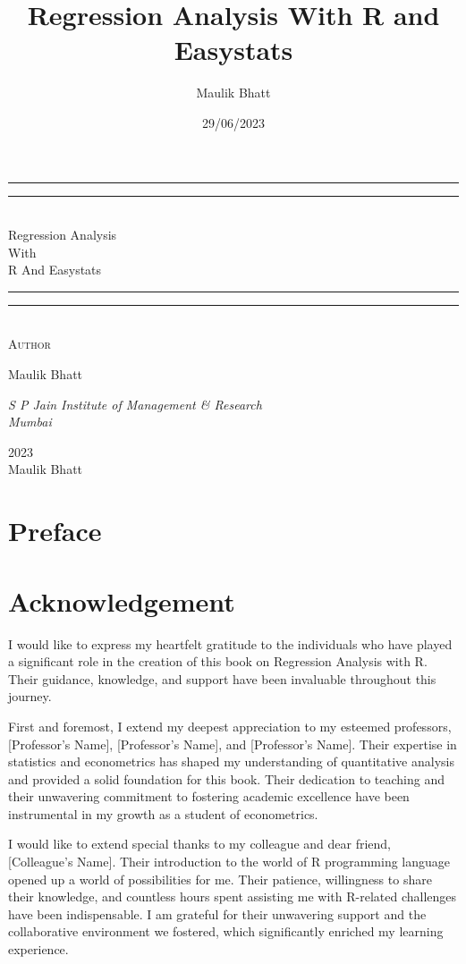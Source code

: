 \documentclass[
  letterpaper,
  paper =a4,
  twoside,
  openright,
  headsepline,
  footsepline,
  listof = totocnumbered,
  chapterprefix = true,
  firstiscover]{scrbook}
\title{Regression Analysis With R and Easystats}
\author{Maulik Bhatt}
\date{29/06/2023}
\renewcommand{\maketitle}{
\begin{titlepage}
	\centering
	\vspace*{\baselineskip}
	\rule{\textwidth}{1.6pt}\vspace*{-\baselineskip}\vspace*{2pt}
	\rule{\textwidth}{0.4pt}\\[\baselineskip]
	{\LARGE Regression Analysis\\ With \\[0.3\baselineskip] R And Easystats}\\[0.2\baselineskip]
	\rule{\textwidth}{0.4pt}\vspace*{-\baselineskip}\vspace{3.2pt}
	\rule{\textwidth}{1.6pt}\\[\baselineskip]
	\scshape
	\vspace*{8\baselineskip}
	Author \\[\baselineskip]
	{\Large Maulik Bhatt \par}
	{\itshape S P Jain Institute of Management \& Research \\ Mumbai\par}
	\vfill
	{\scshape 2023} \\
	{\large Maulik Bhatt}\par%
\end{titlepage}
}
\renewcommand*\contentsname{Table of contents}
\newcommand\contentsname{Table of contents}
\begin{document}
\frontmatter
\maketitle
\ifdefined\Shaded\renewenvironment{Shaded}{\begin{tcolorbox}[borderline west={3pt}{0pt}{shadecolor}, breakable, frame hidden, boxrule=0pt, interior hidden, sharp corners, enhanced]}{\end{tcolorbox}}\fi

\renewcommand*\contentsname{Contents}
{
\hypersetup{linkcolor=}
\setcounter{tocdepth}{2}
\tableofcontents
}
\listoffigures
\listoftables
\mainmatter
{}

\hypertarget{preface}{%
\chapter*{Preface}\label{preface}}



\hypertarget{acknowledgement}{%
\chapter*{Acknowledgement}\label{acknowledgement}}


I would like to express my heartfelt gratitude to the individuals who
have played a significant role in the creation of this book on
Regression Analysis with R. Their guidance, knowledge, and support have
been invaluable throughout this journey.

First and foremost, I extend my deepest appreciation to my esteemed
professors, {[}Professor's Name{]}, {[}Professor's Name{]}, and
{[}Professor's Name{]}. Their expertise in statistics and econometrics
has shaped my understanding of quantitative analysis and provided a
solid foundation for this book. Their dedication to teaching and their
unwavering commitment to fostering academic excellence have been
instrumental in my growth as a student of econometrics.

I would like to extend special thanks to my colleague and dear friend,
{[}Colleague's Name{]}. Their introduction to the world of R programming
language opened up a world of possibilities for me. Their patience,
willingness to share their knowledge, and countless hours spent
assisting me with R-related challenges have been indispensable. I am
grateful for their unwavering support and the collaborative environment
we fostered, which significantly enriched my learning experience.
\end{document}
